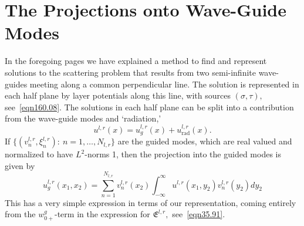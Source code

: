 \documentclass[11pt]{article}
\newcommand\rad{\operatorname{rad}}
\newcommand\fE{\mathfrak E}
\theoremstyle{definition}
\theoremstyle{remark}
\begin{document}
\section{The Projections onto Wave-Guide Modes}\label{sec8.91}
In the foregoing pages we have explained a method to find and
represent solutions to the scattering problem that results from two
semi-infinite wave-guides meeting along a common perpendicular
line. The solution is represented in each half plane by layer
potentials along this line, with sources $(\sigma,\tau),$
see~\eqref{eqn160.08}. The solutions in each half plane can be split
into a contribution from the wave-guide modes and `radiation,'
\begin{equation}
  u^{l,r}(x)=u^{l,r}_g(x)+u^{l,r}_{\rad}(x).
\end{equation}
If $\{(v_n^{l,r},\xi_n^{l,r}):\:n=1,\dots,N_{l,r}\}$ are the guided modes, which
are real valued and normalized to have $L^2$-norms 1, then the projection into
the guided modes is given by
\begin{equation}\label{eqn210.94}
     u^{l,r}_g(x_1,x_2)=\sum_{n=1}^{N_{l,r}}v_{n}^{l,r}(x_2)\int_{-\infty}^{\infty}u^{l,r}(x_1,y_2)v_n^{l,r}(y_2)dy_2
    \end{equation}
This has a very simple expression in terms of our representation, coming
entirely from the $w^g_{0+}$-term in the expression for $\fE^{l,r},$ see~\eqref{eqn35.91}.
\end{document}
